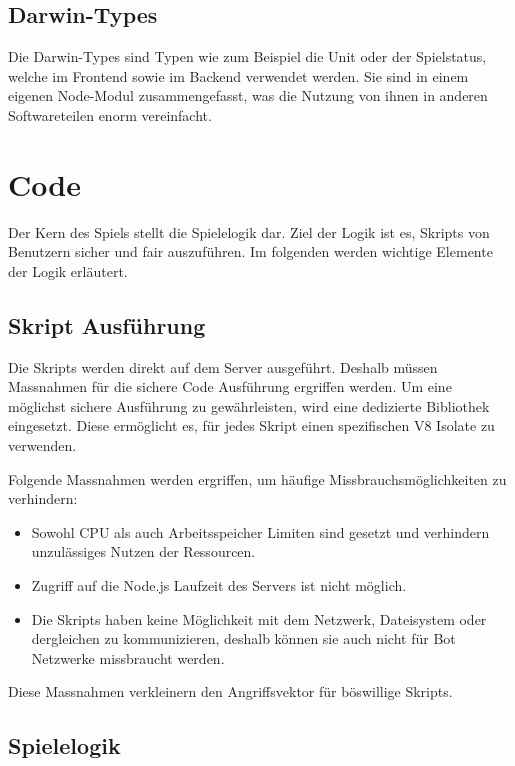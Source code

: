 \documentclass[11pt,a4paper,german]{scrartcl}
\let\oldsection\section
\renewcommand\section{\clearpage\oldsection}
\begin{document}
\subsection{Darwin-Types}
Die Darwin-Types sind Typen wie zum Beispiel die Unit oder der Spielstatus, welche im Frontend sowie im Backend verwendet werden. Sie sind in einem
eigenen Node-Modul zusammengefasst, was die Nutzung von ihnen in anderen Softwareteilen enorm vereinfacht. 

\section{Code}

Der Kern des Spiels stellt die Spielelogik dar. Ziel der Logik ist es, Skripts von Benutzern sicher und fair auszuführen.
Im folgenden werden wichtige Elemente der Logik erläutert.

\subsection{Skript Ausführung}

Die Skripts werden direkt auf dem Server ausgeführt. Deshalb müssen Massnahmen für die sichere Code Ausführung ergriffen werden.
Um eine möglichst sichere Ausführung zu gewährleisten, wird eine dedizierte Bibliothek eingesetzt.
Diese ermöglicht es, für jedes Skript einen spezifischen V8 Isolate zu verwenden.

Folgende Massnahmen werden ergriffen, um häufige Missbrauchsmöglichkeiten zu verhindern:

\begin{itemize}
  \item Sowohl CPU als auch Arbeitsspeicher Limiten sind gesetzt und verhindern unzulässiges Nutzen der Ressourcen.
  \item Zugriff auf die Node.js Laufzeit des Servers ist nicht möglich.
  \item Die Skripts haben keine Möglichkeit mit dem Netzwerk, Dateisystem oder dergleichen zu kommunizieren, deshalb können sie auch nicht für Bot Netzwerke missbraucht werden.
\end{itemize}

Diese Massnahmen verkleinern den Angriffsvektor für böswillige Skripts.

\subsection{Spielelogik}
\end{document}
